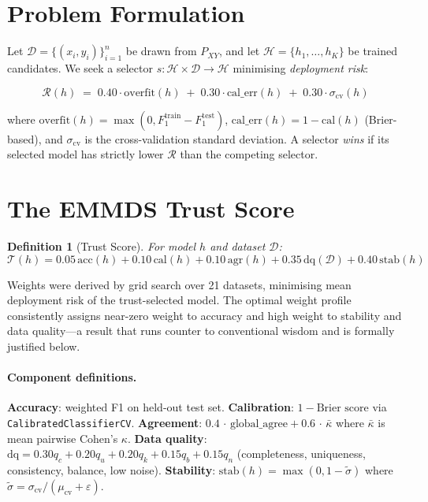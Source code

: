 \documentclass[10pt]{article}
\newtheorem{definition}{Definition}
\newcommand{\trust}{\mathcal{T}}
\newcommand{\risk}{\mathcal{R}}
\begin{document}
\section{Problem Formulation}
\label{sec:problem}

Let $\mathcal{D} = \{(x_i,y_i)\}_{i=1}^n$ be drawn from $P_{XY}$, and let $\mathcal{H} = \{h_1,\ldots,h_K\}$ be trained candidates. We seek a selector $s\colon \mathcal{H}\times\mathcal{D}\to\mathcal{H}$ minimising \emph{deployment risk}:

\begin{equation}
\risk(h) \;=\; 0.40\cdot\text{overfit}(h) \;+\; 0.30\cdot\text{cal\_err}(h) \;+\; 0.30\cdot\sigma_\text{cv}(h)
\label{eq:risk}
\end{equation}

where $\text{overfit}(h)=\max(0, F_1^\text{train}-F_1^\text{test})$, $\text{cal\_err}(h)=1-\text{cal}(h)$ (Brier-based), and $\sigma_\text{cv}$ is the cross-validation standard deviation. A selector \emph{wins} if its selected model has strictly lower $\risk$ than the competing selector.

\section{The EMMDS Trust Score}
\label{sec:trust}

\begin{definition}[Trust Score]
For model $h$ and dataset $\mathcal{D}$:
\begin{equation}
\trust(h) = 0.05\,\text{acc}(h) + 0.10\,\text{cal}(h) + 0.10\,\text{agr}(h) + 0.35\,\text{dq}(\mathcal{D}) + 0.40\,\text{stab}(h)
\label{eq:trust}
\end{equation}
\end{definition}

Weights were derived by grid search over 21 datasets, minimising mean deployment risk of the trust-selected model. The optimal weight profile consistently assigns near-zero weight to accuracy and high weight to stability and data quality—a result that runs counter to conventional wisdom and is formally justified below.

\paragraph{Component definitions.}
\textbf{Accuracy}: weighted F1 on held-out test set.
\textbf{Calibration}: $1 - \text{Brier score}$ via \texttt{CalibratedClassifierCV}.
\textbf{Agreement}: $0.4\,\cdot\,\text{global\_agree} + 0.6\,\cdot\,\bar\kappa$ where $\bar\kappa$ is mean pairwise Cohen's $\kappa$.
\textbf{Data quality}: $\text{dq} = 0.30 q_c + 0.20 q_u + 0.20 q_k + 0.15 q_b + 0.15 q_n$ (completeness, uniqueness, consistency, balance, low noise).
\textbf{Stability}: $\text{stab}(h) = \max(0,1-\tilde\sigma)$ where $\tilde\sigma = \sigma_\text{cv}/(\mu_\text{cv}+\varepsilon)$.
\end{document}
